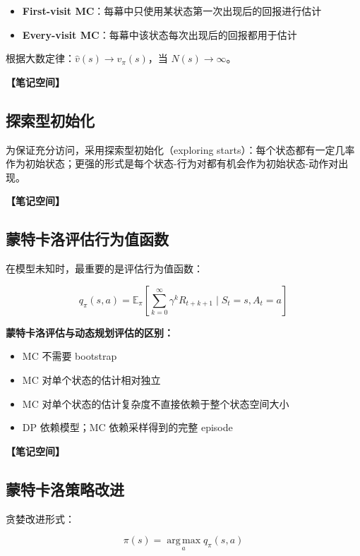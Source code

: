 \documentclass[12pt,a4paper]{article}
\newcommand{\notespace}[1][3cm]{%
  \vspace{#1}%
  \noindent\textbf{【笔记空间】}%
  \vspace{#1}%
}
\newcommand{\E}{\mathbb{E}}
\newcommand{\1}{\mathbf{1}}
\newcommand{\argmax}{\operatorname*{arg\,max}}
\begin{document}
\begin{itemize}[leftmargin=2em]
  \item \textbf{First-visit MC}：每幕中只使用某状态第一次出现后的回报进行估计
  \item \textbf{Every-visit MC}：每幕中该状态每次出现后的回报都用于估计
\end{itemize}

根据大数定律：$\hat{v}(s)\to v_{\pi}(s)$，当 $N(s)\to\infty$。

\notespace[2cm]

\subsection{探索型初始化}

为保证充分访问，采用探索型初始化（exploring starts）：每个状态都有一定几率作为初始状态；更强的形式是每个状态-行为对都有机会作为初始状态-动作对出现。

\notespace[2cm]

\subsection{蒙特卡洛评估行为值函数}

在模型未知时，最重要的是评估行为值函数：

\begin{equation}
q_{\pi}(s,a)=\E_{\pi}\left[\sum_{k=0}^{\infty}\gamma^k R_{t+k+1}\mid S_t=s,A_t=a\right]
\end{equation}

\begin{notebox}
\textbf{蒙特卡洛评估与动态规划评估的区别：}
\begin{itemize}[leftmargin=1.5em]
  \item MC 不需要 bootstrap
  \item MC 对单个状态的估计相对独立
  \item MC 对单个状态的估计复杂度不直接依赖于整个状态空间大小
  \item DP 依赖模型；MC 依赖采样得到的完整 episode
\end{itemize}
\end{notebox}

\notespace[2cm]

\subsection{蒙特卡洛策略改进}

贪婪改进形式：

\begin{equation}
\pi(s)=\argmax_a q_{\pi}(s,a)
\end{equation}
\end{document}
